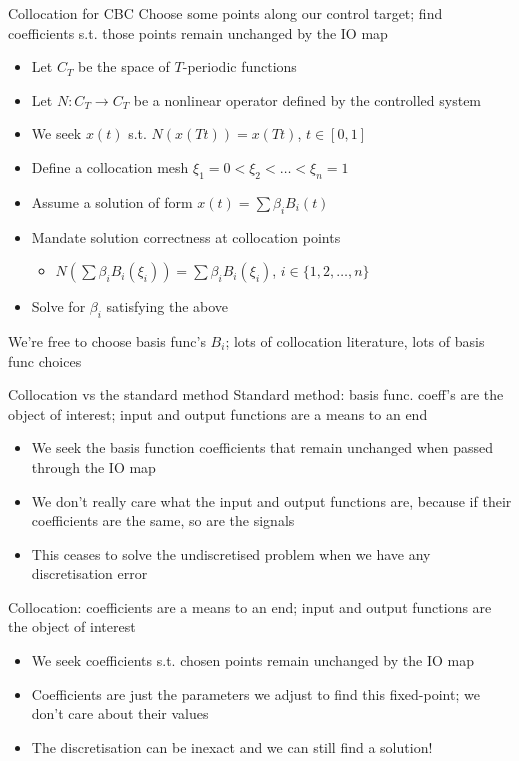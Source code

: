 \documentclass[presentation]{beamer}
\begin{document}
\begin{frame}[label={sec:org3192617}]{Collocation for CBC}
Choose some points along our control target; find coefficients s.t. those points remain unchanged by the IO map
\vfill
\begin{itemize}
\item Let \(C_T\) be the space of \(T\)-periodic functions
\item Let \(N:C_T\to C_T\) be a nonlinear operator defined by the controlled system
\item We seek \(x(t)\) s.t. \(N\left(x(Tt)\right) = x(Tt)\), \(t\in[0,1]\)
\item Define a collocation mesh \(\xi_1 = 0 < \xi_2 < \dots < \xi_n = 1\)
\item Assume a solution of form \(x(t) = \sum\beta_iB_i(t)\)
\item Mandate solution correctness at collocation points
\begin{itemize}
\item \(N\left(\sum\beta_iB_i(\xi_i)\right) = \sum\beta_iB_i(\xi_i)\), \(i\in\{1,2,\dots,n\}\)
\end{itemize}
\item Solve for \(\beta_i\) satisfying the above
\end{itemize}

\vfill
We're free to choose basis func's \(B_i\); lots of collocation literature, lots of basis func choices
\end{frame}

\begin{frame}[label={sec:org1ef5b5f},plain]{Collocation vs the standard method}
Standard method: basis func. coeff's are the object of interest; input and output functions are a means to an end
\begin{itemize}
\item We seek the basis function coefficients that remain unchanged when passed through the IO map
\item We don't really care what the input and output functions are, because if their coefficients are the same, so are the signals
\item This ceases to solve the undiscretised problem when we have any discretisation error
\end{itemize}
\vfill
Collocation: coefficients are a means to an end; input and output functions are the object of interest
\begin{itemize}
\item We seek coefficients s.t. chosen points remain unchanged by the IO map
\item Coefficients are just the parameters we adjust to find this fixed-point; we don't care about their values
\item The discretisation can be inexact and we can still find a solution!
\end{itemize}
\end{frame}
\end{document}
